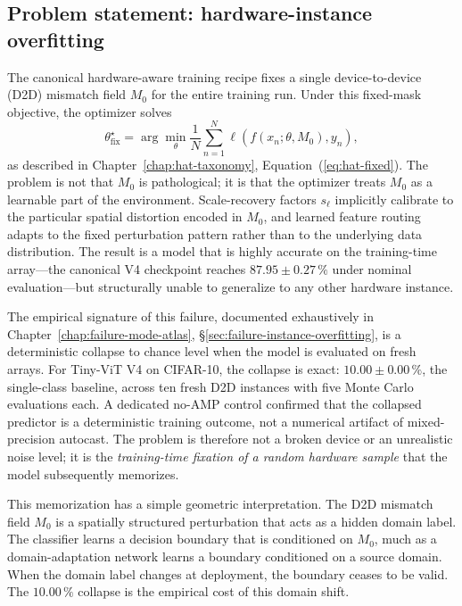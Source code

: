 \subsection{Problem statement: hardware-instance overfitting}

The canonical hardware-aware training recipe fixes a single device-to-device (D2D) mismatch field $M_{0}$ for the entire training run. Under this fixed-mask objective, the optimizer solves
\begin{equation}
    \theta_{\mathrm{fix}}^{\star}=\arg\min_{\theta}\frac{1}{N}\sum_{n=1}^{N}\ell\!\left(f(x_{n};\theta,M_{0}),y_{n}\right),
    \label{eq:fixed-mask-repeat-c5}
\end{equation}
as described in Chapter~\ref{chap:hat-taxonomy}, Equation~(\ref{eq:hat-fixed}). The problem is not that $M_{0}$ is pathological; it is that the optimizer treats $M_{0}$ as a learnable part of the environment. Scale-recovery factors $s_{\ell}$ implicitly calibrate to the particular spatial distortion encoded in $M_{0}$, and learned feature routing adapts to the fixed perturbation pattern rather than to the underlying data distribution. The result is a model that is highly accurate on the training-time array---the canonical V4 checkpoint reaches $87.95\pm0.27\,\%$ under nominal evaluation---but structurally unable to generalize to any other hardware instance.

The empirical signature of this failure, documented exhaustively in Chapter~\ref{chap:failure-mode-atlas}, \S\ref{sec:failure-instance-overfitting}, is a deterministic collapse to chance level when the model is evaluated on fresh arrays. For Tiny-ViT V4 on CIFAR-10, the collapse is exact: $10.00\pm0.00\,\%$, the single-class baseline, across ten fresh D2D instances with five Monte Carlo evaluations each. A dedicated no-AMP control confirmed that the collapsed predictor is a deterministic training outcome, not a numerical artifact of mixed-precision autocast. The problem is therefore not a broken device or an unrealistic noise level; it is the \emph{training-time fixation of a random hardware sample} that the model subsequently memorizes.

This memorization has a simple geometric interpretation. The D2D mismatch field $M_{0}$ is a spatially structured perturbation that acts as a hidden domain label. The classifier learns a decision boundary that is conditioned on $M_{0}$, much as a domain-adaptation network learns a boundary conditioned on a source domain. When the domain label changes at deployment, the boundary ceases to be valid. The $10.00\,\%$ collapse is the empirical cost of this domain shift.

